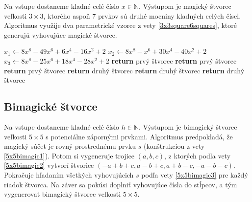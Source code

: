 \begin{alg}
\label{algsquare3x3x}
Na vstupe dostaneme kladné celé číslo $x \in \mathbb{N}$. Výstupom je magický štvorec veľkosti $3 \times 3$, ktorého aspoň $7$ prvkov sú druhé mocniny kladných celých čísel. Algoritmus využije dva parametrické vzorce z vety \ref{3x3square6squares}, ktoré generujú vyhovujúce magické štvorce.
\end{alg}

\begin{algorithmic}
\STATE $x_1 \gets 8x^8 - 49x^6 + 6x^4 - 16x^2 + 2$
\STATE $x_2 \gets 8x^8 - x^6 + 30x^4 - 40x^2 + 2$
\STATE $x_3 \gets 8x^8 - 25x^6 + 18x^4 - 28x^2 + 2$
    \STATE \textbf{return} prvý štvorec
\ENDIF
{}
    \STATE \textbf{return} prvý štvorec
\ENDIF
{}
    \STATE \textbf{return} prvý štvorec
\ENDIF
{}
    \STATE \textbf{return} druhý štvorec
\ENDIF
{}
    \STATE \textbf{return} druhý štvorec
\ENDIF
{}
    \STATE \textbf{return} druhý štvorec
\ENDIF
\end{algorithmic}

\subsection{Bimagické štvorce}

\begin{alg}
\label{algsquare5x5b}
Na vstupe dostaneme kladné celé číslo $h \in \mathbb{N}$. Výstupom je bimagický štvorec veľkosti $5 \times 5$ s potenciálne zápornými prvkami. Algoritmus predpokladá, že magický súčet je rovný prostrednému prvku $s$ (konštrukciou z vety \ref{5x5bimagic1}). Potom si vygeneruje trojice $(a,b,c)$, z ktorých podľa vety \ref{5x5bimagic2} vytvorí štvorice $(-a+b+c, a-b+c, a+b-c, -a-b-c)$. Pokračuje hľadaním všetkých vyhovujúcich $s$ podľa vety \ref{5x5bimagic3} pre každý riadok štvorca. Na záver sa pokúsi doplniť vyhovujúce čísla do stĺpcov, a tým vygenerovať bimagický štvorec veľkosti $5 \times 5$.
\end{alg}


